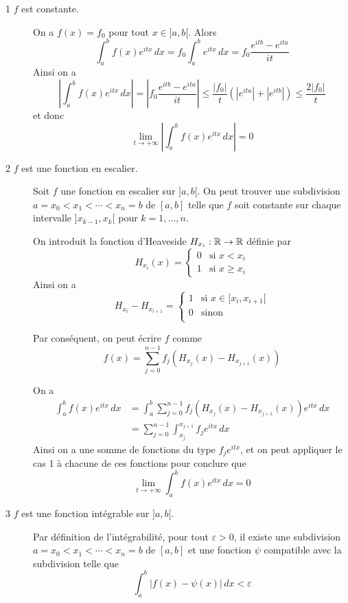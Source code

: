 \documentclass[a4paper,12pt]{article}
\begin{document}
\begin{demonstration}
    \begin{description}
        \item[1 $f$ est constante.]
        On a $f(x) = f_0$ pour tout $x \in ]a, b[$. Alors
        $$
        \int_a^b f(x) e^{i t x} \, dx = f_0 \int_a^b e^{i t x} \, dx = f_0 \frac{e^{i t b} - e^{i t a}}{i t}
        $$
        Ainsi on a
        $$
        \left| \int_a^b f(x) e^{i t x} \, dx \right| = \left| f_0 \frac{e^{i t b} - e^{i t a}}{i t} \right| \leq  \frac{|f_0|}{t} (|e^{i t a}| + |e^{i t b}|) \leq \frac{2 |f_0|}{t}
        $$
        et donc
        $$
        \lim_{t \to +\infty} \left| \int_a^b f(x) e^{i t x} \, dx \right| = 0
        $$

        \item[2 $f$ est une fonction en escalier.]
        Soit $f$ une fonction en escalier sur $]a, b[$. On peut trouver une subdivision $a = x_0 < x_1 < \cdots < x_n = b$ de $[a, b]$ telle que $f$ soit constante sur chaque intervalle $]x_{k-1}, x_k[$ pour $k = 1, \ldots, n$.

        On introduit la fonction d'Heaveside $H_{x_i} : \mathbb{R} \to \mathbb{R}$ définie par
        $$
        H_{x_i}(x) = \begin{cases}
        0 & \text{si } x < x_i \\
        1 & \text{si } x \geq x_i
        \end{cases}
        $$
        Ainsi on a
        $$
        H_{x_i} - H_{x_{i+1}} = \begin{cases}
            1 & \text{si } x \in [x_i, x_{i+1}[ \\
            0 & \text{sinon } \\
        \end{cases} 
        $$

        Par conséquent, on peut écrire $f$ comme
        $$
        f(x) = \sum_{j=0}^{n-1} f_j(H_{x_j}(x) - H_{x_{j+1}}(x))
        $$

        On a
        \begin{align*}
            \int_a^b f(x) e^{i t x} \, dx &= \int_a^b \sum_{j=0}^{n-1} f_j(H_{x_j}(x) - H_{x_{j+1}}(x)) e^{i t x} \, dx \\
            &= \sum_{j=0}^{n-1} \int_{x_j}^{x_{j+1}} f_j e^{i t x} \, dx
        \end{align*}
        Ainsi on a une somme de fonctions du type $f_j e^{i t x}$, et on peut appliquer le cas 1 à chacune de ces fonctions pour conclure que
        $$
        \lim_{t \to +\infty} \int_a^b f(x) e^{i t x} \, dx = 0
        $$

        \item[{3 $f$ est une fonction intégrable sur $]a, b[$.}]
        
        Par définition de l'intégrabilité, pour tout $\varepsilon > 0$, il existe une subdivision $a = x_0 < x_1 < \cdots < x_n = b$ de $[a, b]$
        et une fonction $\psi$ compatible avec la subdivision telle que
        $$
        \int_a^b |f(x) - \psi(x)| \, dx < \varepsilon
        $$
    \end{description}
\end{demonstration}
\end{document}
